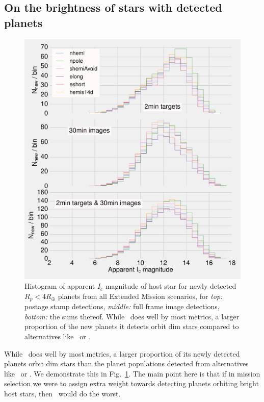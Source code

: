 \subsection{On the brightness of stars with detected planets}
\begin{figure}[!t]
	\centering
	\includegraphics[]{figures/160729_icmag_t50_all.pdf}
	\caption{Histogram of apparent $I_c$ magnitude of host star for newly detected $R_p<4R_\oplus$ planets from all Extended Mission scenarios, for \textit{top:} postage stamp detections, \textit{middle:} full frame image detections, \textit{bottom:} the sums thereof.
	While \npole\ does well by most metrics, a larger proportion of the new planets it detects orbit dim stars compared to alternatives like \hemis\ or \shemiAvoid.}
	\label{fig:icmag_meta}
\end{figure}
While \npole\ does well by most metrics, a larger proportion of its newly detected planets orbit dim stars than the planet populations detected from alternatives like \hemis\ or \shemiAvoid.
We demonstrate this in Fig.~\ref{fig:icmag_meta}.
The main point here is that if in mission selection we were to assign extra weight towards detecting planets orbiting bright host stars, then \npole\ would do the worst.
